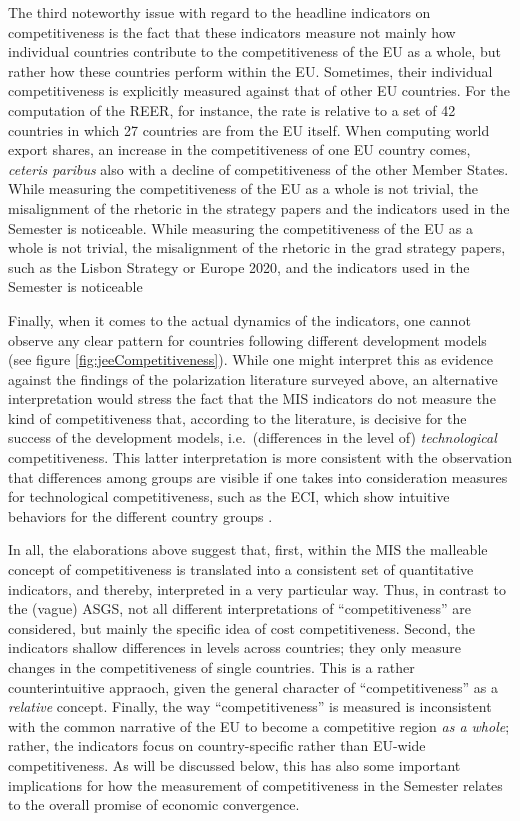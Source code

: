 \documentclass[
]{article}
\begin{document}
The third noteworthy issue with regard to the headline indicators on
competitiveness is the fact that these indicators measure not mainly how
individual countries contribute to the competitiveness of the EU as a whole,
but rather how these countries perform within the EU.
Sometimes, their individual competitiveness is explicitly measured against that
of other EU countries. For the computation of the REER, for instance, the rate
is relative to a set of 42 countries in which 27 countries are from the EU itself.
When computing world export shares, an increase in the competitiveness of
one EU country comes, \emph{ceteris paribus} also with a decline of competitiveness
of the other Member States. While measuring the competitiveness of the EU as
a whole is not trivial, the misalignment of the rhetoric in the strategy papers
and the indicators used in the Semester is noticeable.
While measuring the competitiveness of the EU as
a whole is not trivial, the misalignment of the rhetoric in the grad strategy
papers, such as the Lisbon Strategy or Europe 2020,
and the indicators used in the Semester is noticeable

Finally, when it comes to the actual dynamics of the indicators, one cannot
observe any clear pattern for countries
following different development models (see figure \ref{fig:jeeCompetitiveness}).
While one might interpret this as evidence against the findings of the
polarization literature surveyed above, an alternative interpretation would
stress the fact that the MIS indicators do not measure the kind of
competitiveness that, according to the literature, is decisive for the success
of the development models, i.e.~(differences in the level of)
\emph{technological} competitiveness.
This latter interpretation is more consistent with the observation that
differences among groups are visible if one takes into consideration measures
for technological competitiveness, such as the ECI, which show intuitive
behaviors for the different country groups \citep{Graebner.2020u}.

In all, the elaborations above suggest that, first,
within the MIS the malleable concept of
competitiveness is translated into a consistent set of quantitative indicators,
and thereby, interpreted in a very particular way.
Thus, in contrast to the (vague) ASGS, not all different interpretations of
\enquote{competitiveness} are considered, but mainly the specific idea of cost
competitiveness.
Second, the indicators shallow differences in levels across countries; they
only measure changes in the competitiveness of single countries. This is a
rather counterintuitive appraoch, given the general character of
\enquote{competitiveness} as a \emph{relative} concept.
Finally, the way \enquote{competitiveness} is measured is inconsistent with the
common narrative of the EU to become a competitive region \emph{as a whole};
rather, the indicators focus on country-specific rather than EU-wide
competitiveness. As will be discussed below, this has also some important
implications for how the measurement of competitiveness in the Semester relates
to the overall promise of economic convergence.
\end{document}
